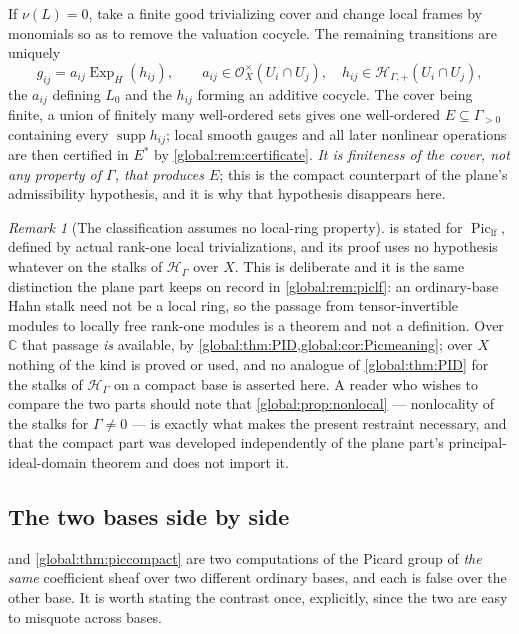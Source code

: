 \documentclass[11pt,letterpaper]{article}
\theoremstyle{definition}
\theoremstyle{remark}
\newtheorem{remark}[remark]{Remark}
\newcommand{\C}{\mathbb C}
\newcommand{\OO}{\mathcal O}
\newcommand{\HH}{\mathscr H_\Gamma}
\newcommand{\HP}{\mathscr H_{\Gamma,+}}
\newcommand{\supp}{\operatorname{supp}}
\newcommand{\Piclf}{\operatorname{Pic}_{\mathrm{lf}}}
\newcommand{\ExpH}{\operatorname{Exp}_{H}}
\numberwithin{equation}{section}
\begin{document}
If $\nu(L)=0$, take a finite good trivializing cover and change local frames by monomials so as to remove the valuation cocycle. The remaining transitions are uniquely
\begin{equation}\label{global:eq:normalcocycle}
  g_{ij}=a_{ij}\ExpH(h_{ij}),\qquad
  a_{ij}\in\OO_X^\times(U_i\cap U_j),\quad h_{ij}\in\HP(U_i\cap U_j),
\end{equation}
the $a_{ij}$ defining $L_0$ and the $h_{ij}$ forming an additive cocycle. The cover being finite, a union of finitely many well-ordered sets gives one well-ordered $E\subseteq\Gamma_{>0}$ containing every $\supp h_{ij}$; local smooth gauges and all later nonlinear operations are then certified in $E^*$ by \cref{global:rem:certificate}. \emph{It is finiteness of the cover, not any property of $\Gamma$, that produces $E$}; this is the compact counterpart of the plane's admissibility hypothesis, and it is why that hypothesis disappears here.

\begin{remark}[The classification assumes no local-ring property]\label{global:rem:piclfcompact}
 is stated for $\Piclf$, defined by actual rank-one local trivializations, and its proof uses no hypothesis whatever on the stalks of $\HH$ over $X$. This is deliberate and it is the same distinction the plane part keeps on record in \cref{global:rem:piclf}: an ordinary-base Hahn stalk need not be a local ring, so the passage from tensor-invertible modules to locally free rank-one modules is a theorem and not a definition. Over $\C$ that passage \emph{is} available, by \cref{global:thm:PID,global:cor:Picmeaning}; over $X$ nothing of the kind is proved or used, and no analogue of \cref{global:thm:PID} for the stalks of $\HH$ on a compact base is asserted here. A reader who wishes to compare the two parts should note that \cref{global:prop:nonlocal} --- nonlocality of the stalks for $\Gamma\ne0$ --- is exactly what makes the present restraint necessary, and that the compact part was developed independently of the plane part's principal-ideal-domain theorem and does not import it.
\end{remark}

\subsection{The two bases side by side}\label{global:sub:twohalves}

 and \cref{global:thm:piccompact} are two computations of the Picard group of \emph{the same} coefficient sheaf over two different ordinary bases, and each is false over the other base. It is worth stating the contrast once, explicitly, since the two are easy to misquote across bases.
\end{document}
